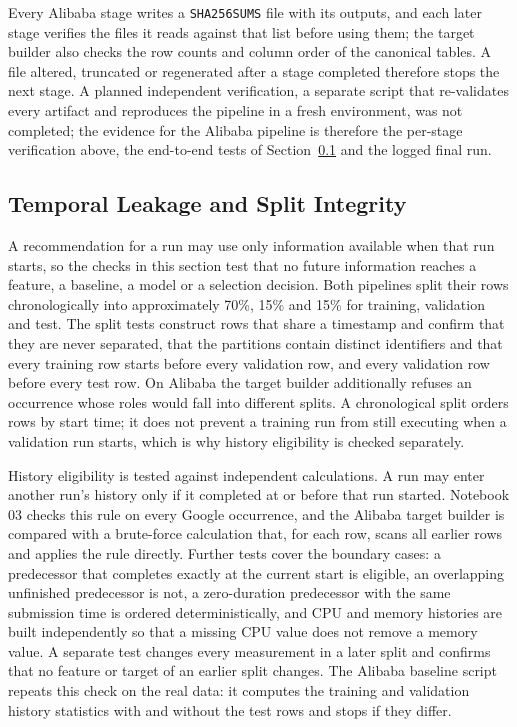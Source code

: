 Every Alibaba stage writes a \texttt{SHA256SUMS} file with its outputs, and each later stage verifies the files it reads against that list before using them; the target builder also checks the row counts and column order of the canonical tables. A file altered, truncated or regenerated after a stage completed therefore stops the next stage. A planned independent verification, a separate script that re-validates every artifact and reproduces the pipeline in a fresh environment, was not completed; the evidence for the Alibaba pipeline is therefore the per-stage verification above, the end-to-end tests of Section~\ref{sec:6.2} and the logged final run.

\subsection{Temporal Leakage and Split Integrity}\label{sec:6.2}

A recommendation for a run may use only information available when that run starts, so the checks in this section test that no future information reaches a feature, a baseline, a model or a selection decision. Both pipelines split their rows chronologically into approximately 70\%, 15\% and 15\% for training, validation and test. The split tests construct rows that share a timestamp and confirm that they are never separated, that the partitions contain distinct identifiers and that every training row starts before every validation row, and every validation row before every test row. On Alibaba the target builder additionally refuses an occurrence whose roles would fall into different splits. A chronological split orders rows by start time; it does not prevent a training run from still executing when a validation run starts, which is why history eligibility is checked separately.

History eligibility is tested against independent calculations. A run may enter another run's history only if it completed at or before that run started. Notebook 03 checks this rule on every Google occurrence, and the Alibaba target builder is compared with a brute-force calculation that, for each row, scans all earlier rows and applies the rule directly. Further tests cover the boundary cases: a predecessor that completes exactly at the current start is eligible, an overlapping unfinished predecessor is not, a zero-duration predecessor with the same submission time is ordered deterministically, and CPU and memory histories are built independently so that a missing CPU value does not remove a memory value. A separate test changes every measurement in a later split and confirms that no feature or target of an earlier split changes. The Alibaba baseline script repeats this check on the real data: it computes the training and validation history statistics with and without the test rows and stops if they differ.


